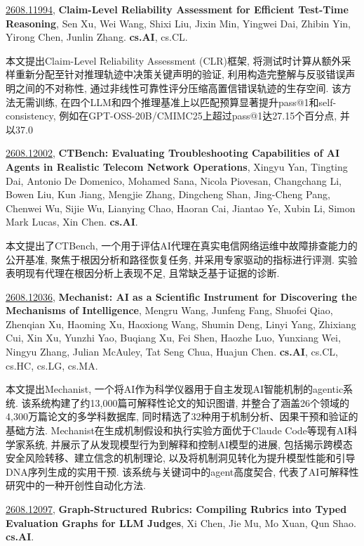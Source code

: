 \documentclass[9pt, a4paper]{article}
\theoremstyle{plain}
\theoremstyle{definition}
\theoremstyle{remark}
\newcommand{\arxivwithtarget}[3]{\hypertarget{#1}{}\href{https://arxiv.org/abs/#1}{#1}, \textbf{\textcolor{arxivblue}{#2}}, #3. }
\begin{document}
\arxivwithtarget{2608.11994}{Claim-Level Reliability Assessment for Efficient Test-Time Reasoning}{Sen Xu, Wei Wang, Shixi Liu, Jixin Min, Yingwei Dai, Zhibin Yin, Yirong Chen, Junlin Zhang}\textbf{cs.AI}, cs.CL.

本文提出Claim-Level Reliability Assessment (CLR)框架, 将测试时计算从额外采样重新分配至针对推理轨迹中决策关键声明的验证, 利用构造完整解与反驳错误声明之间的不对称性, 通过非线性可靠性评分压缩高置信错误轨迹的生存空间. 该方法无需训练, 在四个LLM和四个推理基准上以匹配预算显著提升pass@1和self-consistency, 例如在GPT-OSS-20B/CMIMC25上超过pass@1达27.15个百分点, 并以37.0%


\arxivwithtarget{2608.12002}{CTBench: Evaluating Troubleshooting Capabilities of AI Agents in Realistic Telecom Network Operations}{Xingyu Yan, Tingting Dai, Antonio De Domenico, Mohamed Sana, Nicola Piovesan, Changchang Li, Bowen Liu, Kun Jiang, Mengjie Zhang, Dingcheng Shan, Jing-Cheng Pang, Chenwei Wu, Sijie Wu, Lianying Chao, Haoran Cai, Jiantao Ye, Xubin Li, Simon Mark Lucas, Xin Chen}\textbf{cs.AI}.

本文提出了CTBench, 一个用于评估AI代理在真实电信网络运维中故障排查能力的公开基准, 聚焦于根因分析和路径恢复任务, 并采用专家驱动的指标进行评测. 实验表明现有代理在根因分析上表现不足, 且常缺乏基于证据的诊断.


\arxivwithtarget{2608.12036}{Mechanist: AI as a Scientific Instrument for Discovering the Mechanisms of Intelligence}{Mengru Wang, Junfeng Fang, Shuofei Qiao, Zhenqian Xu, Haoming Xu, Haoxiong Wang, Shumin Deng, Linyi Yang, Zhixiang Cui, Xin Xu, Yunzhi Yao, Buqiang Xu, Fei Shen, Haozhe Luo, Yunxiang Wei, Ningyu Zhang, Julian McAuley, Tat Seng Chua, Huajun Chen}\textbf{cs.AI}, cs.CL, cs.HC, cs.LG, cs.MA.

本文提出Mechanist, 一个将AI作为科学仪器用于自主发现AI智能机制的agentic系统. 该系统构建了约13,000篇可解释性论文的知识图谱, 并整合了涵盖26个领域的4,300万篇论文的多学科数据库, 同时精选了32种用于机制分析、因果干预和验证的基础方法. Mechanist在生成机制假设和执行实验方面优于Claude Code等现有AI科学家系统, 并展示了从发现模型行为到解释和控制AI模型的进展, 包括揭示跨模态安全风险转移、建立信念的机制理论, 以及将机制洞见转化为提升模型性能和引导DNA序列生成的实用干预. 该系统与关键词中的agent高度契合, 代表了AI可解释性研究中的一种开创性自动化方法.


\arxivwithtarget{2608.12097}{Graph-Structured Rubrics: Compiling Rubrics into Typed Evaluation Graphs for LLM Judges}{Xi Chen, Jie Mu, Mo Xuan, Qun Shao}\textbf{cs.AI}.
\end{document}
